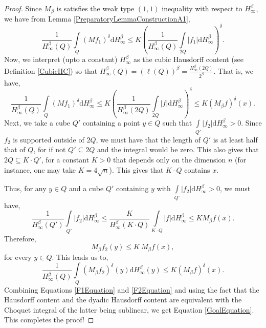 \documentclass{amsart}
\numberwithin{theorem}{section}
\numberwithin{equation}{section}
\begin{document}
\begin{proof}
			Since $M_{\beta}$ is satisfies the weak type $(1, 1)$ inequality with respect to $H^{\beta}_{\infty}$, we have from Lemma \ref{PreparatoryLemmaConstructionA1},
			$$\frac{1}{H^{\beta}_{\infty} \left( Q \right)} \int\limits_{Q} \left( Mf_1 \right)^{\delta} \mathrm{d}H^{\beta}_{\infty} \leq K \left( \frac{1}{H^{\beta}_{\infty} \left( Q \right)} \int\limits_{2Q} \left| f_1 \right| \mathrm{d}H^{\beta}_{\infty} \right)^{\delta}.$$
			Now, we interpret (upto a constant) $H^{\beta}_{\infty}$ as the cubic Hausdorff content (see Definition \ref{CubicHC}) so that $H^{\beta}_{\infty} \left( Q \right) = \left( \ell \left( Q \right) \right)^{\beta} = \frac{H^{\beta}_{\infty} \left( 2Q \right)}{2^{\beta}}$. That is, we have,
			\begin{equation}
				\label{F1Equation}
				\frac{1}{H^{\beta}_{\infty} \left( Q \right)} \int\limits_{Q} \left( Mf_1 \right)^{\delta} \mathrm{d}H^{\beta}_{\infty} \leq K \left( \frac{1}{H^{\beta}_{\infty} \left( 2Q \right)} \int\limits_{2Q} \left| f \right| \mathrm{d}H^{\beta}_{\infty} \right)^{\delta} \leq K \left( M_{\beta}f \right)^{\delta} \left( x \right).
			\end{equation}
			Next, we take a cube $Q'$ containing a point $y \in Q$ such that $\int\limits_{Q'} \left| f_2 \right| \mathrm{d}H^{\beta}_{\infty} > 0$. Since $f_2$ is supported outside of $2Q$, we must have that the length of $Q'$ is at least half that of $Q$, for if not $Q' \subseteq 2Q$ and the integral would be zero. This also gives that $2Q \subseteq K \cdot Q'$, for a constant $K > 0$ that depends only on the dimension $n$ (for instance, one may take $K = 4 \sqrt{n}$). This gives that $K \cdot Q$ contains $x$.
			
			Thus, for any $y \in Q$ and a cube $Q'$ containing $y$ with $\int\limits_{Q'} \left| f_2 \right| \mathrm{d}H^{\beta}_{\infty} > 0$, we must have,
			$$\frac{1}{H^{\beta}_{\infty} \left( Q' \right)} \int\limits_{Q'} \left| f_2 \right| \mathrm{d}H^{\beta}_{\infty} \leq \frac{K}{H^{\beta}_{\infty} \left( K \cdot Q \right)} \int\limits_{K \cdot Q} \left| f \right| \mathrm{d}H^{\beta}_{\infty} \leq K M_{\beta}f \left( x \right).$$
			Therefore,
			$$M_{\beta}f_2 \left( y \right) \leq K \ M_{\beta}f \left( x \right),$$
			for every $y \in Q$. This leads us to,
			\begin{equation}
				\label{F2Equation}
				\frac{1}{H^{\beta}_{\infty} \left( Q \right)} \int\limits_{Q} \left( M_{\beta}f_2 \right)^{\delta} \left( y \right) \mathrm{d}H^{\beta}_{\infty} \left( y \right) \leq K \left( M_{\beta}f \right)^{\delta} \left( x \right).
			\end{equation}
			Combining Equations \eqref{F1Equation} and \eqref{F2Equation} and using the fact that the Hausdorff content and the dyadic Hausdorff content are equivalent with the Choquet integral of the latter being sublinear, we get Equation \eqref{GoalEquation}. This completes the proof!
		\end{proof}
\end{document}
